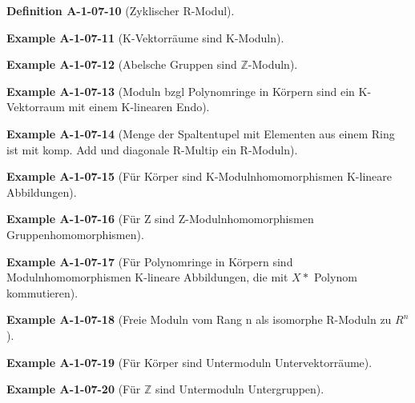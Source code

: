 \documentclass[10pt, letterpaper]{article}
\newcommand{\Z}{\mathbb{Z}}
\newcommand{\CustomHeading}[3]{%
  \par\medskip\noindent%
  \textbf{#1 #2} \textnormal{(#3)}.\enskip%
}
\newenvironment{DEF}[2]{\CustomHeading{Definition}{#1}{#2}}{}
\newenvironment{EXA}[2]{\CustomHeading{Example}{#1}{#2}}{}
\begin{document}
\begin{DEF}{A-1-07-10}{Zyklischer R-Modul}
\end{DEF}

\begin{EXA}{A-1-07-11}{K-Vektorräume sind K-Moduln}
\end{EXA}

\begin{EXA}{A-1-07-12}{Abelsche Gruppen sind $\Z$-Moduln}
\end{EXA}

\begin{EXA}{A-1-07-13}{Moduln bzgl Polynomringe in Körpern sind ein K-Vektorraum mit einem K-linearen Endo}
\end{EXA}

\begin{EXA}{A-1-07-14}{Menge der Spaltentupel mit Elementen aus einem Ring ist mit komp. Add und diagonale R-Multip ein R-Moduln}
\end{EXA}

\begin{EXA}{A-1-07-15}{Für Körper sind K-Modulnhomomorphismen K-lineare Abbildungen}
\end{EXA}

\begin{EXA}{A-1-07-16}{Für Z sind Z-Modulnhomomorphismen Gruppenhomomorphismen}
\end{EXA}

\begin{EXA}{A-1-07-17}{Für Polynomringe in Körpern sind Modulnhomomorphismen K-lineare Abbildungen, die mit $X*$ Polynom kommutieren}
\end{EXA}

\begin{EXA}{A-1-07-18}{Freie Moduln vom Rang n als isomorphe R-Moduln zu $R^n$}
\end{EXA}

\begin{EXA}{A-1-07-19}{Für Körper sind Untermoduln Untervektorräume}
\end{EXA}

\begin{EXA}{A-1-07-20}{Für $\Z$ sind Untermoduln Untergruppen}
\end{EXA}
\end{document}
